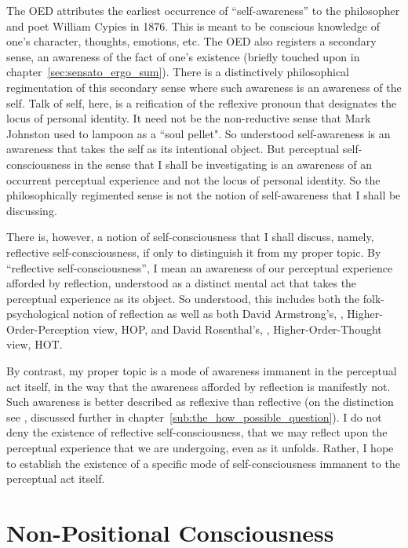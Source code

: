 The OED attributes the earliest occurrence of ``self-awareness'' to the philosopher and poet William Cypies in 1876. This is meant to be conscious knowledge of one's character, thoughts, emotions, etc. The OED also registers a secondary sense, an awareness of the fact of one's existence (briefly touched upon in chapter~\ref{sec:sensato_ergo_sum}). There is a distinctively philosophical regimentation of this secondary sense where such awareness is an awareness of the self. Talk of self, here, is a reification of the reflexive pronoun that designates the locus of personal identity. It need not be the non-reductive sense that Mark Johnston used to lampoon as a ``soul pellet". So understood self-awareness is an awareness that takes the self as its intentional object. But perceptual self-consciousness in the sense that I shall be investigating is an awareness of an occurrent perceptual experience and not the locus of personal identity. So the philosophically regimented sense is not the notion of self-awareness that I shall be discussing.

There is, however, a notion of self-consciousness that I shall discuss, namely, reflective self-consciousness, if only to distinguish it from my proper topic. By ``reflective self-consciousness'', I mean an awareness of our perceptual experience afforded by reflection, understood as a distinct mental act that takes the perceptual experience as its object. So understood, this includes both the folk-psychological notion of reflection as well as both David Armstrong's, \citeyear{Armstrong:1968ns}, Higher-Order-Percep\-tion view, HOP, and David Rosenthal's, \citeyear{Rosenthal:1986jt}, Higher-Order-Thought view, HOT. 

By contrast, my proper topic is a mode of awareness immanent in the perceptual act itself, in the way that the awareness afforded by reflection is manifestly not. Such awareness is better described as reflexive than reflective (on the distinction see \citealt[778 n56]{caston02}, discussed further in chapter~\ref{sub:the_how_possible_question}). I do not deny the existence of reflective self-consciousness, that we may reflect upon the perceptual experience that we are undergoing, even as it unfolds. Rather, I hope to establish the existence of a specific mode of self-consciousness immanent to the perceptual act itself.


\section{Non-Positional Consciousness} %
\label{sartre}

